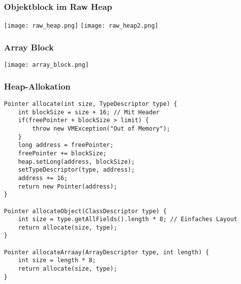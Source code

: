 \subsubsection{Objektblock im Raw Heap}
\texttt{[image: raw\_heap.png]}
\texttt{[image: raw\_heap2.png]}

\subsubsection{Array Block}
\texttt{[image: array\_block.png]}

\subsubsection{Heap-Allokation}
\begin{lstlisting}
Pointer allocate(int size, TypeDescriptor type) {
    int blockSize = size + 16; // Mit Header
    if(freePointer + blockSize > limit) {
        throw new VMException("Out of Memory");
    }
    long address = freePointer;
    freePointer += blockSize;
    heap.setLong(address, blockSize);
    setTypeDescriptor(type, address);
    address += 16;
    return new Pointer(address);
}

Pointer allocateObject(ClassDescriptor type) {
    int size = type.getAllFields().length * 8; // Einfaches Layout 
    return allocate(size, type);
}

Pointer allocateArraay(ArrayDescriptor type, int length) {
    int size = length * 8;
    return allocate(size, type);
}
\end{lstlisting}
